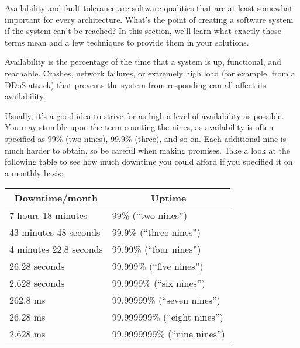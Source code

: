 
Availability and fault tolerance are software qualities that are at least somewhat important for every architecture. What's the point of creating a software system if the system can't be reached? In this section, we'll learn what exactly those terms mean and a few techniques to provide them in your solutions.



Availability is the percentage of the time that a system is up, functional, and reachable. Crashes, network failures, or extremely high load (for example, from a DDoS attack) that prevents the system from responding can all affect its availability.

Usually, it's a good idea to strive for as high a level of availability as possible. You may stumble upon the term counting the nines, as  availability is often specified as 99\% (two nines), 99.9\% (three), and so on. Each additional nine is much harder to obtain, so be careful when making promises. Take a look at the following table to see how much downtime you could afford if you specified it on a monthly basis:


\begin{table}[H]
	\begin{tabular}{|l|l|}
		\hline
		\multicolumn{1}{|c|}{\textbf{Downtime/month}} & \multicolumn{1}{c|}{\textbf{Uptime}} \\ \hline
		7 hours 18 minutes                            & 99\% (“two nines”)                   \\ \hline
		43 minutes 48 seconds                         & 99.9\% (“three nines”)               \\ \hline
		4 minutes 22.8 seconds                        & 99.99\% (“four nines”)               \\ \hline
		26.28 seconds                                 & 99.999\% (“five nines”)              \\ \hline
		2.628 seconds                                 & 99.9999\% (“six nines”)              \\ \hline
		262.8 ms                                      & 99.99999\% (“seven nines”)           \\ \hline
		26.28 ms                                      & 99.999999\% (“eight nines”)          \\ \hline
		2.628 ms                                      & 99.9999999\% (“nine nines”)          \\ \hline
	\end{tabular}
\end{table}

